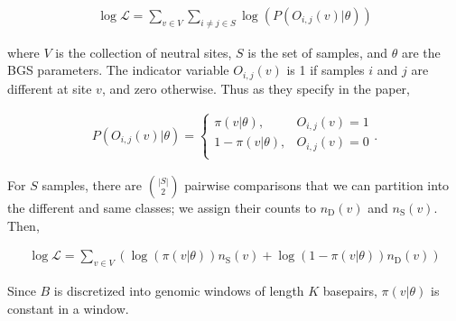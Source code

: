 \documentclass[11pt]{article}
\begin{document}
\begin{align}
  \log\mathcal{L} = \sum_{v \in V} \sum_{i \ne j \in S} \log(P(O_{i,j}(v) | \theta))
\end{align}

where $V$ is the collection of neutral sites, $S$ is the set of samples, and
$\theta$ are the BGS parameters. The indicator variable $O_{i,j}(v)$ is 1 if
samples $i$ and $j$ are different at site $v$, and zero otherwise. Thus as they
specify in the paper, 

\begin{align}
  P(O_{i,j}(v) | \theta) = 
    \begin{cases}
      \pi(v | \theta), & O_{i,j}(v) = 1 \\
      1-\pi(v | \theta), & O_{i,j}(v) = 0 \\
    \end{cases}.
\end{align}

For $S$ samples, there are $|S| \choose 2$ pairwise comparisons that we can
partition into the different and same classes; we assign their counts to
$n_\text{D}(v)$ and $n_\text{S}(v)$. Then, 

\begin{align}
  \log\mathcal{L} = \sum_{v \in V} \left(\log(\pi(v | \theta)) n_\text{S}(v) + \log(1-\pi(v | \theta)) n_\text{D}(v)\right)
\end{align}

Since $B$ is discretized into genomic windows of length $K$ basepairs, $\pi(v |
\theta)$ is constant in a window.



\printbibliography
\end{document}
